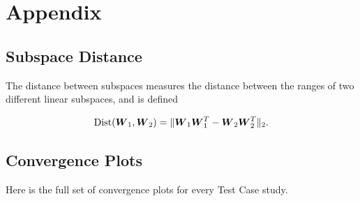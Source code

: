 \documentclass[]{aiaa-tc}%
\begin{document}
\newpage
\section{Appendix} \label{sec:appendix}
\subsection{Subspace Distance}
The distance between subspaces measures the distance between the ranges of two different linear subspaces, and is defined\cite{constantine2015}

\begin{equation}
\label{eq:subspace_distance}
\text{Dist}(\boldsymbol{W}_1,\boldsymbol{W}_2) = \|\boldsymbol{W}_1\boldsymbol{W}_1^T - \boldsymbol{W}_2\boldsymbol{W}_2^T\|_2.
\end{equation}

\subsection{Convergence Plots}
Here is the full set of convergence plots for every Test Case study.
\end{document}
